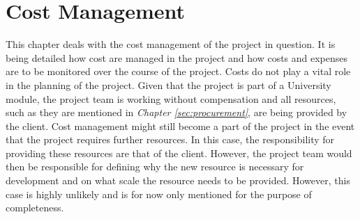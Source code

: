 \section{Cost Management}
\label{sec:cost}

This chapter deals with the cost management of the project in question. It is being detailed how cost are managed in the project and how costs and expenses are to be monitored over the course of the project.
\newline
Costs do not play a vital role in the planning of the project. Given that the project is part of a University module, the project team is working without compensation and all resources, such as they are mentioned in \textit{Chapter \ref{sec:procurement}}, are being provided by the client.
\newline
Cost management might still become a part of the project in the event that the project requires further resources. In this case, the responsibility for providing these resources are that of the client. However, the project team would then be responsible for defining why the new resource is necessary for development and on what scale the resource needs to be provided. However, this case is highly unlikely and is for now only mentioned for the purpose of completeness.

